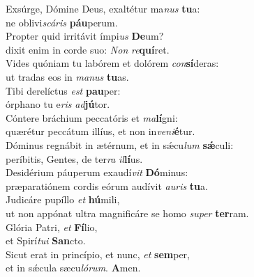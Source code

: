 \oddverse Exsúrge, Dómine Deus, exaltétur ma\textit{nus} \textbf{tu}a:~\*\\
\oddverse ne oblivi\textit{scá}\textit{ris} \textbf{páu}perum.\\
\evenverse Propter quid irritávit ímpi\textit{us} \textbf{De}um?~\*\\
\evenverse dixit enim in corde suo: \textit{Non} \textit{re}\textbf{quí}ret.\\
\oddverse Vides quóniam tu labórem et dolórem \textit{con}\textbf{sí}deras:~\*\\
\oddverse ut tradas eos in \textit{ma}\textit{nus} \textbf{tu}as.\\
\evenverse Tibi derelíctus \textit{est} \textbf{pau}per:~\*\\
\evenverse órphano tu e\textit{ris} \textit{ad}\textbf{jú}tor.\\
\oddverse Cóntere bráchium peccatóris et \textit{ma}\textbf{lí}gni:~\*\\
\oddverse quærétur peccátum illíus, et non in\textit{ve}\textit{ni}\textbf{é}tur.\\
\evenverse Dóminus regnábit in ætérnum, et in sǽcu\textit{lum} \textbf{sǽ}culi:~\*\\
\evenverse períbitis, Gentes, de ter\textit{ra} \textit{il}\textbf{lí}us.\\
\oddverse Desidérium páuperum exaudí\textit{vit} \textbf{Dó}minus:~\*\\
\oddverse præparatiónem cordis eórum audívit \textit{au}\textit{ris} \textbf{tu}a.\\
\evenverse Judicáre pupíllo \textit{et} \textbf{hú}mili,~\*\\
\evenverse ut non appónat ultra magnificáre se homo \textit{su}\textit{per} \textbf{ter}ram.\\
\oddverse Glória Patri, \textit{et} \textbf{Fí}lio,~\*\\
\oddverse et Spirí\textit{tu}\textit{i} \textbf{San}cto.\\
\evenverse Sicut erat in princípio, et nunc, \textit{et} \textbf{sem}per,~\*\\
\evenverse et in sǽcula sæcu\textit{ló}\textit{rum}. \textbf{A}men.\\
